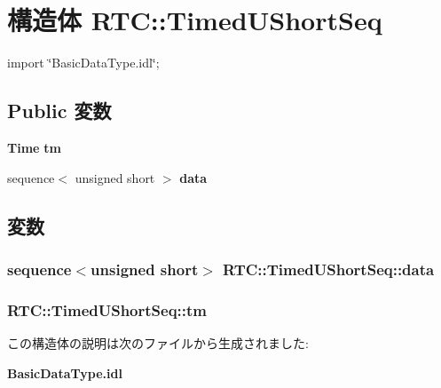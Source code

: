 \section{構造体 RTC::TimedUShortSeq}
\label{structRTC_1_1TimedUShortSeq}


{\ttfamily import \char`\"{}BasicDataType.idl\char`\"{};}

\subsection*{Public 変数}
\begin{DoxyCompactItemize}
\item 
{\bf Time} {\bf tm}
\item 
sequence$<$ unsigned short $>$ {\bf data}
\end{DoxyCompactItemize}


\subsection{変数}
\subsubsection[{data}]{\setlength{\rightskip}{0pt plus 5cm}sequence$<$unsigned short$>$ {\bf RTC::TimedUShortSeq::data}}\label{structRTC_1_1TimedUShortSeq_a6cb2fb6b13889f2f3b2b0770091665f0}
\subsubsection[{tm}]{ {\bf RTC::TimedUShortSeq::tm}}\label{structRTC_1_1TimedUShortSeq_aeeda8eae16460106bee7b7163fb4ffd6}


この構造体の説明は次のファイルから生成されました:\begin{DoxyCompactItemize}
\item 
{\bf BasicDataType.idl}\end{DoxyCompactItemize}
